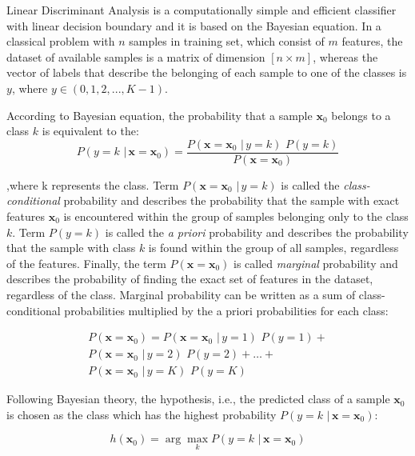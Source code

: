 \documentclass{article}
\newcommand{\argmax}{\arg\!\max} %
\begin{document}
Linear Discriminant Analysis is a computationally simple and efficient classifier with linear decision boundary and it is based on the Bayesian equation. In a classical problem with $n$ samples in training set, which consist of $m$ features, the dataset of available samples is a matrix of dimension $[n \times m]$, whereas the vector of labels that describe the belonging of each sample to one of the classes is $y$, where $y \in (0,1,2,...,K-1)$.

According to Bayesian equation, the probability that a sample $\mathbf{x}_0$ belongs to a class $k$ is equivalent to the: 
\begin{equation} 
P(y=k \,\, | \, \mathbf{x}=\mathbf{x}_0) = \frac{P(\mathbf{x}=\mathbf{x}_0  \,\, | \, y=k) \,\,P(y=k)} {P(\mathbf{x}=\mathbf{x}_0)}
\end{equation}

\noindent
,where k represents the class. Term $P(\mathbf{x}=\mathbf{x}_0  \,\, | \, y=k)$ is called the \emph{class-conditional} probability and describes the probability that the sample with exact features $\mathbf{x}_0$ is encountered within the group of samples belonging only to the class $k$. Term $P(y=k)$ is called the \emph{a priori} probability and describes the probability that the sample with class $k$ is found within the group of all samples, regardless of the features. Finally, the term $P(\mathbf{x}=\mathbf{x}_0)$ is called \emph{marginal} probability and describes the probability of finding the exact set of features in the dataset, regardless of the class. Marginal probability can be written as a sum of class-conditional probabilities multiplied by the a priori probabilities for each class:

\begin{equation}
\begin{split}
P(\mathbf{x}=\mathbf{x}_0) = P(\mathbf{x}=\mathbf{x}_0  \,\, | \, y=1) \,\,P(y=1) + \\
P(\mathbf{x}=\mathbf{x}_0  \,\, | \, y=2) \,\,P(y=2) + \dots + \\
P(\mathbf{x}=\mathbf{x}_0  \,\, | \, y=K) \,\,P(y=K)
\end{split}
\end{equation}


Following Bayesian theory, the hypothesis, i.e., the predicted class of a sample $\mathbf{x}_0$ is chosen as the class which has the highest probability $P(y=k \,\, | \, \mathbf{x}=\mathbf{x}_0)$:

\begin{equation} 
h(\mathbf{x}_0) = \argmax_k P(y=k \,\, | \, \mathbf{x}=\mathbf{x}_0)
\end{equation}
\end{document}

